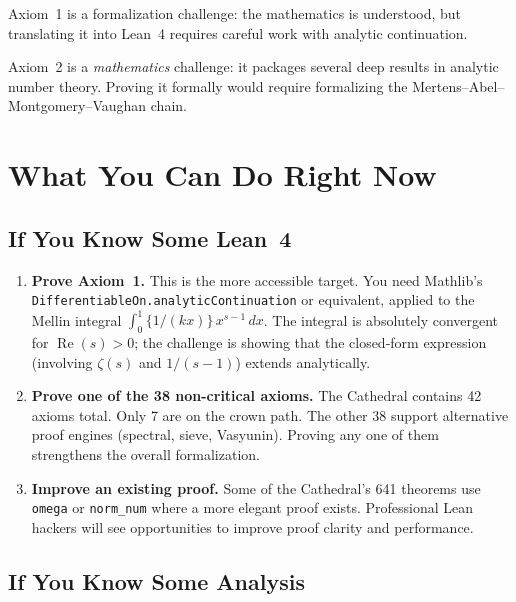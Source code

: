 \documentclass[11pt,a4paper]{article}
\begin{document}
Axiom~1 is a formalization challenge: the mathematics is understood,
but translating it into Lean~4 requires careful work with analytic
continuation.

Axiom~2 is a \emph{mathematics} challenge: it packages several
deep results in analytic number theory. Proving it formally would
require formalizing the Mertens--Abel--Montgomery--Vaughan chain.

\section*{What You Can Do Right Now}

\subsection*{If You Know Some Lean~4}

\begin{enumerate}
  \item \textbf{Prove Axiom~1.} This is the more accessible target.
    You need Mathlib's \texttt{DifferentiableOn.analyticContinuation}
    or equivalent, applied to the Mellin integral
    $\int_0^1 \{1/(kx)\}\,x^{s-1}\,dx$. The integral is absolutely
    convergent for $\operatorname{Re}(s) > 0$; the challenge is
    showing that the closed-form expression (involving $\zeta(s)$
    and $1/(s-1)$) extends analytically.

  \item \textbf{Prove one of the 38 non-critical axioms.} The
    Cathedral contains 42 axioms total. Only 7 are on the crown
    path. The other 38 support alternative proof engines (spectral,
    sieve, Vasyunin). Proving any one of them strengthens the
    overall formalization.

  \item \textbf{Improve an existing proof.} Some of the Cathedral's
    641 theorems use \texttt{omega} or \texttt{norm\_num} where
    a more elegant proof exists. Professional Lean hackers will
    see opportunities to improve proof clarity and performance.
\end{enumerate}

\subsection*{If You Know Some Analysis}
\end{document}
